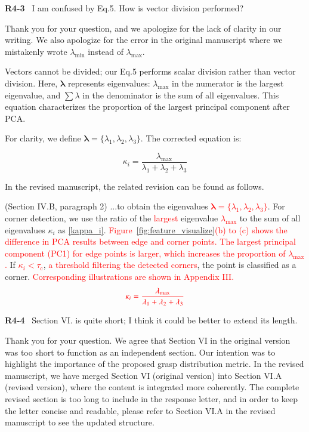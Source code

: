 \documentclass[journal]{IEEEtran}
\newcommand{\rev}[1]{\textcolor{red}{#1}}
\begin{document}
\noindent
{\textbf{\color{black}R4-3}\color{gray}~
I am confused by Eq.5. How is vector division performed?
}

Thank you for your question, and we apologize for the lack of clarity in our writing. We also apologize for the error in the original manuscript where we mistakenly wrote $\lambda_{\min}$ instead of $\lambda_{\max}$. 

Vectors cannot be divided; our Eq.5 performs scalar division rather than vector division. Here, $\boldsymbol{\lambda}$ represents eigenvalues: $\lambda_{\max}$ in the numerator is the largest eigenvalue, and $\sum{\lambda}$ in the denominator is the sum of all eigenvalues. This equation characterizes the proportion of the largest principal component after PCA. 

For clarity, we define $\boldsymbol{\lambda} = \{\lambda_1, \lambda_2, \lambda_3\}$. The corrected equation is:

\begin{equation}
    \kappa_i = \frac{\lambda_{\max}}{\lambda_1 + \lambda_2 + \lambda_3}
    \label{eq:pca_ratio}
\end{equation}

In the revised manuscript, the related revision can be found as follows.

(Section IV.B, paragraph 2)
...to obtain the eigenvalues \rev{$\boldsymbol{\lambda} = \{\lambda_1, \lambda_2, \lambda_3\}$}. For corner detection, we use the ratio of the \rev{largest} eigenvalue \rev{$\lambda_{\max}$} to the sum of all eigenvalues \( \kappa_i\) as \cref{kappa_i}. \rev{Figure~\ref{fig:feature_visualize}(b) to (c) shows the difference in PCA results between edge and corner points. The largest principal component (PC1) for edge points is larger, which increases the proportion of $\lambda_{\max}$.} If \rev{$\kappa_i < \tau_\text{c}$}, \rev{a threshold filtering the detected corners}, the point is classified as a corner.  \rev{Corresponding illustrations are shown in Appendix III.}
\begin{equation}
\rev{
    \kappa_i = \frac{\lambda_{\max}}{\lambda_1 + \lambda_2 + \lambda_3}
    \label{kappa_i}
    }
\end{equation}

\bigskip

\noindent
{\textbf{\color{black}R4-4}\color{gray}~
Section VI. is quite short; I think it could be better to extend its length.
}

Thank you for your question. We agree that Section VI in the original version was too short to function as an independent section. Our intention was to highlight the importance of the proposed grasp distribution metric. In the revised manuscript, we have merged Section VI (original version) into Section VI.A (revised version), where the content is integrated more coherently. The complete revised section is too long to include in the response letter, and in order to keep the letter concise and readable, please refer to Section VI.A in the revised manuscript to see the updated structure.
\end{document}
